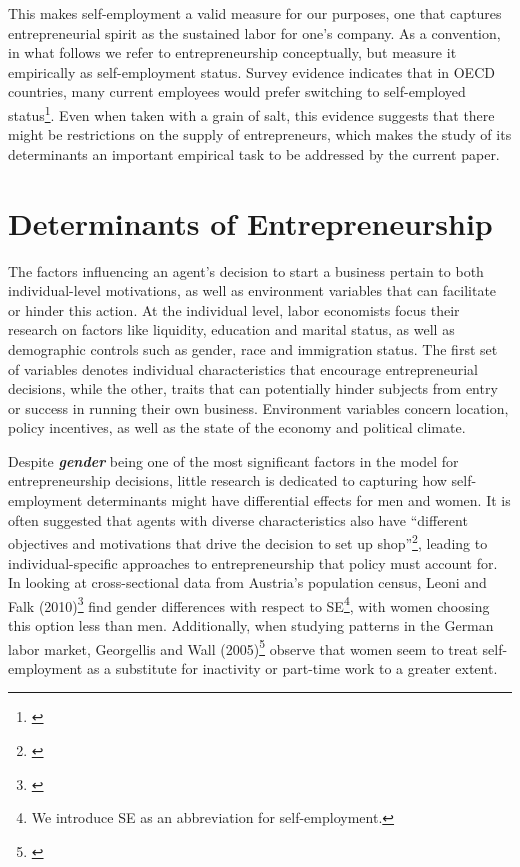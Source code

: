 This makes self-employment a valid measure for our purposes, one that captures entrepreneurial spirit as the sustained labor for one's company. As a convention, in what follows we refer to entrepreneurship conceptually, but measure it empirically as self-employment status. Survey evidence indicates that in OECD countries, many current employees would prefer switching to self-employed status\footnote{\cite{BlanchflowerOswald1998}}. Even when taken with a grain of salt, this evidence suggests that there might be restrictions on the supply of entrepreneurs, which makes the study of its determinants an important empirical task to be addressed by the current paper. 


\section{Determinants of Entrepreneurship}

The factors influencing an agent's decision to start a business pertain to both individual-level motivations, as well as environment variables that can facilitate or hinder this action. At the individual level, labor economists focus their research on factors like liquidity, education and marital status, as well as demographic controls such as gender, race and immigration status. The first set of variables denotes individual characteristics that encourage entrepreneurial decisions, while the other, traits that can potentially hinder subjects from entry or success in running their own business. Environment variables concern location, policy incentives, as well as the state of the economy and political climate. 


Despite \textbf{\textit{gender}} being one of the most significant factors in the model for entrepreneurship decisions, little research is dedicated to capturing how self-employment determinants might have differential effects for men and women. It is often suggested that agents with diverse characteristics also have ``different objectives and motivations that drive the decision to set up shop''\footnote{\cite{LeoniFalk2010}}, leading to individual-specific approaches to entrepreneurship that policy must account for. In looking at cross-sectional data from Austria's population census, Leoni and Falk (2010)\footnote{\cite{LeoniFalk2010}} find gender differences with respect to SE\footnote{ We introduce SE as an abbreviation for self-employment.}, with women choosing this option less than men. Additionally, when studying patterns in the German labor market, Georgellis and Wall (2005)\footnote{\cite{GeorgellisWall2005}} observe that women seem to treat self-employment as a substitute for inactivity or part-time work to a greater extent. 

